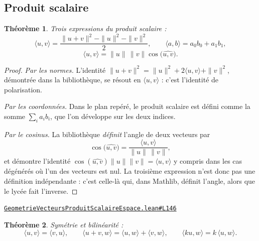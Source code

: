 \documentclass[11pt,a4paper]{article}
\theoremstyle{definition}
\theoremstyle{plain}
\newtheorem{theoreme}{Théorème}
\newcommand{\source}[2]{\par\smallskip\noindent\hfill{\footnotesize\href{#1}{\texttt{#2}}}\par\smallskip}
\begin{document}
\subsection{Produit scalaire}

\begin{theoreme}
Trois expressions du produit scalaire :
\[ \langle u, v\rangle = \frac{\|u + v\|^{2} - \|u\|^{2} - \|v\|^{2}}{2} , \qquad
   \langle a, b\rangle = a_0 b_0 + a_1 b_1 , \]
\[ \langle u, v\rangle = \|u\|\,\|v\|\cos\bigl(\widehat{u, v}\bigr) . \]
\end{theoreme}

\begin{proof}
\emph{Par les normes.} L'identité $\|u + v\|^{2} = \|u\|^{2} + 2\langle u, v\rangle +
\|v\|^{2}$, démontrée dans la bibliothèque, se résout en $\langle u, v\rangle$ : c'est
l'identité de polarisation.

\emph{Par les coordonnées.} Dans le plan repéré, le produit scalaire est défini comme la
somme $\sum_i a_i b_i$, que l'on développe sur les deux indices.

\emph{Par le cosinus.} La bibliothèque \emph{définit} l'angle de deux vecteurs par
\[ \cos\bigl(\widehat{u, v}\bigr) = \frac{\langle u, v\rangle}{\|u\|\,\|v\|} , \]
et démontre l'identité $\cos(\widehat{u,v}) \|u\| \|v\| = \langle u, v\rangle$ y compris
dans les cas dégénérés où l'un des vecteurs est nul. La troisième expression n'est donc
pas une définition indépendante : c'est celle-là qui, dans Mathlib, définit l'angle, alors
que le lycée fait l'inverse.
\end{proof}
\source{https://github.com/Commutator-IO/learn-lean/blob/main/courses/02-lycee/08-geometrie-vecteurs-produit-scalaire-espace/GeometrieVecteursProduitScalaireEspace.lean\#L146}{GeometrieVecteursProduitScalaireEspace.lean\#L146}

\begin{theoreme}
Symétrie et bilinéarité :
\[ \langle u, v\rangle = \langle v, u\rangle, \qquad
   \langle u + v, w\rangle = \langle u, w\rangle + \langle v, w\rangle, \qquad
   \langle k u, w\rangle = k\,\langle u, w\rangle . \]
\end{theoreme}
\end{document}
